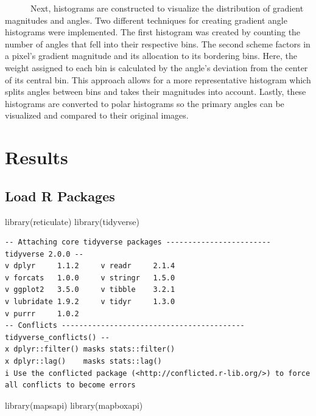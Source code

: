 \documentclass[
  letterpaper,
]{report}
\newenvironment{Shaded}{\begin{snugshade}}{\end{snugshade}}
\newcommand{\FunctionTok}[1]{\textcolor[rgb]{0.28,0.35,0.67}{#1}}
\newcommand{\NormalTok}[1]{\textcolor[rgb]{0.00,0.23,0.31}{#1}}
\begin{document}
\hfill\break
~~~~~~Next, histograms are constructed to visualize the distribution of
gradient magnitudes and angles. Two different techniques for creating
gradient angle histograms were implemented. The first histogram was
created by counting the number of angles that fell into their respective
bins. The second scheme factors in a pixel's gradient magnitude and its
allocation to its bordering bins. Here, the weight assigned to each bin
is calculated by the angle's deviation from the center of its central
bin. This approach allows for a more representative histogram which
splits angles between bins and takes their magnitudes into account.
Lastly, these histograms are converted to polar histograms so the
primary angles can be visualized and compared to their original images.


\hypertarget{results}{%
\chapter{Results}\label{results}}

\hypertarget{load-r-packages}{%
\section{Load R Packages}\label{load-r-packages}}

\begin{Shaded}
\begin{Highlighting}[]
\FunctionTok{library}\NormalTok{(reticulate)}
\FunctionTok{library}\NormalTok{(tidyverse)}
\end{Highlighting}
\end{Shaded}

\begin{verbatim}
-- Attaching core tidyverse packages ------------------------ tidyverse 2.0.0 --
v dplyr     1.1.2     v readr     2.1.4
v forcats   1.0.0     v stringr   1.5.0
v ggplot2   3.5.0     v tibble    3.2.1
v lubridate 1.9.2     v tidyr     1.3.0
v purrr     1.0.2     
-- Conflicts ------------------------------------------ tidyverse_conflicts() --
x dplyr::filter() masks stats::filter()
x dplyr::lag()    masks stats::lag()
i Use the conflicted package (<http://conflicted.r-lib.org/>) to force all conflicts to become errors
\end{verbatim}

\begin{Shaded}
\begin{Highlighting}[]
\FunctionTok{library}\NormalTok{(mapsapi)}
\FunctionTok{library}\NormalTok{(mapboxapi)}
\end{Highlighting}
\end{Shaded}
\end{document}
